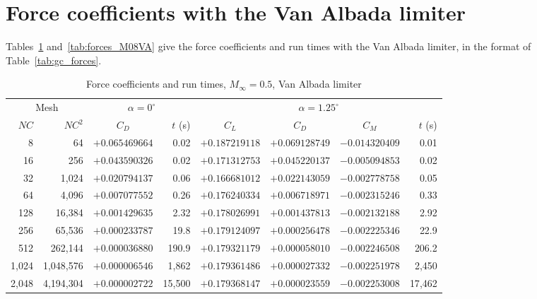 \documentclass[12pt,a4paper]{article}
\begin{document}
\clearpage
\section{Force coefficients with the Van Albada limiter}\label{app:va_forces}

Tables~\ref{tab:forces_M05VA} and~\ref{tab:forces_M08VA} give the force coefficients and run times
with the Van Albada limiter, in the format of Table~\ref{tab:gc_forces}.

\begin{table}[H]
\centering
\caption{Force coefficients and run times, $M_\infty=0.5$, Van Albada limiter}
\label{tab:forces_M05VA}
\footnotesize
\setlength{\tabcolsep}{4pt}
\renewcommand{\arraystretch}{1.0}
\begin{tabular}{@{}rrcrcccr@{}}
\toprule
\multicolumn{2}{c}{Mesh} & \multicolumn{2}{c}{$\alpha=0^\circ$} & \multicolumn{4}{c}{$\alpha=1.25^\circ$} \\
\cmidrule(lr){1-2}\cmidrule(lr){3-4}\cmidrule(l){5-8}
$NC$ & $NC^2$ & $C_D$ & $t$ (s) & $C_L$ & $C_D$ & $C_M$ & $t$ (s) \\
\midrule
8 & 64 & $+0.065469664$ & 0.02 & $+0.187219118$ & $+0.069128749$ & $-0.014320409$ & 0.01 \\
16 & 256 & $+0.043590326$ & 0.02 & $+0.171312753$ & $+0.045220137$ & $-0.005094853$ & 0.02 \\
32 & 1{,}024 & $+0.020794137$ & 0.06 & $+0.166681012$ & $+0.022143059$ & $-0.002778758$ & 0.05 \\
64 & 4{,}096 & $+0.007077552$ & 0.26 & $+0.176240334$ & $+0.006718971$ & $-0.002315246$ & 0.33 \\
128 & 16{,}384 & $+0.001429635$ & 2.32 & $+0.178026991$ & $+0.001437813$ & $-0.002132188$ & 2.92 \\
256 & 65{,}536 & $+0.000233787$ & 19.8 & $+0.179124097$ & $+0.000256478$ & $-0.002225346$ & 22.9 \\
512 & 262{,}144 & $+0.000036880$ & 190.9 & $+0.179321179$ & $+0.000058010$ & $-0.002246508$ & 206.2 \\
1{,}024 & 1{,}048{,}576 & $+0.000006546$ & 1{,}862 & $+0.179361486$ & $+0.000027332$ & $-0.002251978$ & 2{,}450 \\
2{,}048 & 4{,}194{,}304 & $+0.000002722$ & 15{,}500 & $+0.179368147$ & $+0.000023559$ & $-0.002253008$ & 17{,}462 \\
\bottomrule
\end{tabular}
\end{table}
\end{document}
